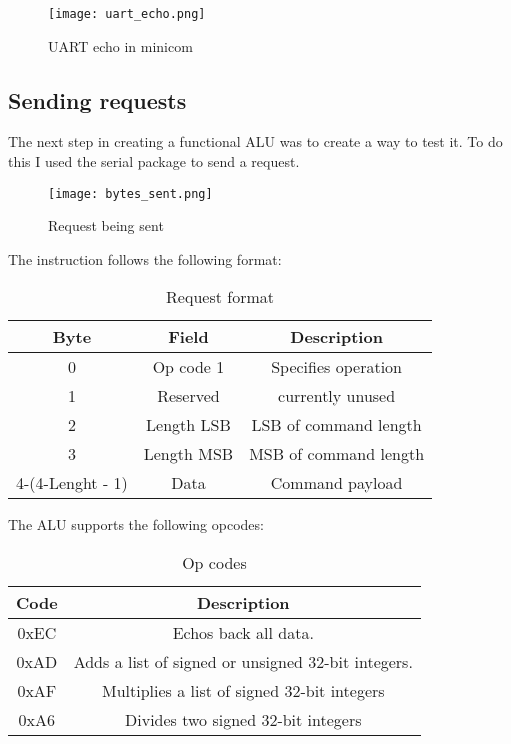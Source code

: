\documentclass{article}
\begin{document}
\begin{figure}[h]
  \centering
  \texttt{[image: uart\_echo.png]}
  \caption{UART echo in minicom}
\end{figure}

\subsection{Sending requests}

The next step in creating a functional ALU was to create a way to test it. To do this I used the serial package to send a request.

\begin{figure}[h]
  \centering
  \texttt{[image: bytes\_sent.png]}
  \caption{Request being sent}
\end{figure}

\newpage

The instruction follows the following format:
\begin{table}[h]
  \centering
  \begin{tabular}{|c|c|c|}
    \hline
    Byte & Field & Description\\
    \hline
    0 & Op code 1 & Specifies operation \\
    \hline
    1 & Reserved & currently unused \\
    \hline
    2 & Length LSB & LSB of command length \\
    \hline
    3 & Length MSB & MSB of command length \\
    \hline
    4-(4-Lenght - 1) & Data & Command payload \\
    \hline
  \end{tabular}
  \caption{Request format}
\end{table}

The ALU supports the following opcodes:
\begin{table}[h]
  \centering
  \begin{tabular}{|c|c|}
    \hline
    Code  & Description\\
    \hline
    0xEC & Echos back all data.  \\
    \hline
    0xAD & Adds a list of signed or unsigned 32-bit integers. \\
    \hline
    0xAF & Multiplies a list of signed 32-bit integers \\
    \hline
    0xA6 & Divides two signed 32-bit integers \\
    \hline
  \end{tabular}
  \caption{Op codes}
\end{table}
\end{document}
